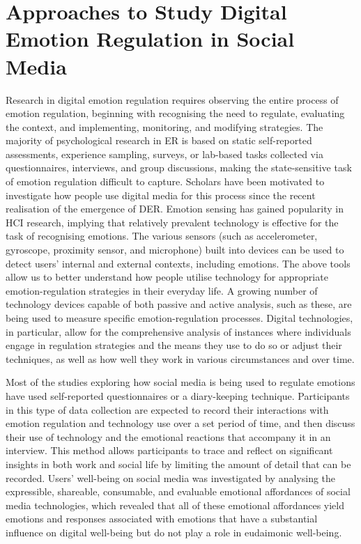 \documentclass[lettersize,journal]{IEEEtran}
\begin{document}
\section{Approaches to Study Digital Emotion Regulation in Social Media}
Research in digital emotion regulation requires observing the entire process of emotion regulation, beginning with recognising the need to regulate, evaluating the context, and implementing, monitoring, and modifying strategies. The majority of psychological research in ER is based on static self-reported assessments, experience sampling, surveys, or lab-based tasks collected via questionnaires, interviews, and group discussions, making the state-sensitive task of emotion regulation difficult to capture. Scholars have been motivated to investigate how people use digital media for this process since the recent realisation of the emergence of DER. Emotion sensing has gained popularity in HCI research, implying that relatively prevalent technology is effective for the task of recognising emotions. The various sensors (such as accelerometer, gyroscope, proximity sensor, and microphone) built into devices can be used to detect users' internal and external contexts, including emotions. The above tools allow us to better understand how people utilise technology for appropriate emotion-regulation strategies in their everyday life. A growing number of technology devices capable of both passive and active analysis, such as these, are being used to measure specific emotion-regulation processes. Digital technologies, in particular, allow for the comprehensive analysis of instances where individuals engage in regulation strategies and the means they use to do so or adjust their techniques, as well as how well they work in various circumstances and over time. 


Most of the studies exploring how social media is being used to regulate emotions have used self-reported questionnaires or a diary-keeping technique. Participants in this type of data collection are expected to record their interactions with emotion regulation and technology use over a set period of time, and then discuss their use of technology and the emotional reactions that accompany it in an interview. This method allows participants to trace and reflect on significant insights in both work and social life by limiting the amount of detail that can be recorded. Users' well-being on social media was investigated by analysing the expressible, shareable, consumable, and evaluable emotional affordances of social media technologies, which revealed that all of these emotional affordances yield emotions and responses associated with emotions that have a substantial influence on digital well-being but do not play a role in eudaimonic well-being. 
\end{document}
